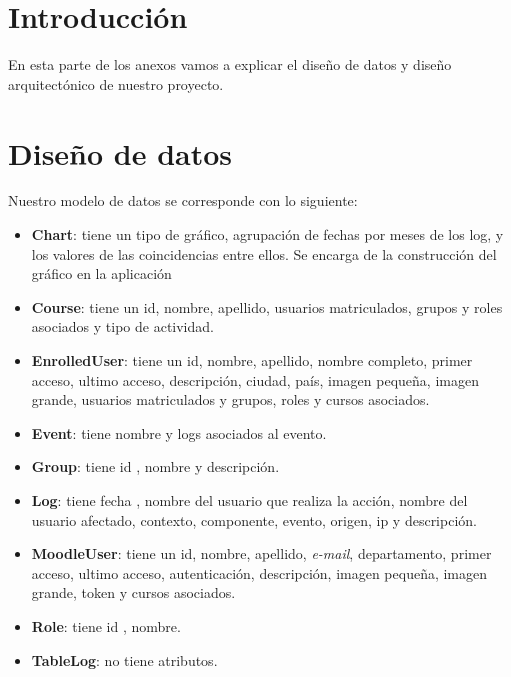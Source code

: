 
\section{Introducción}

En esta parte de los anexos vamos a explicar el diseño de datos y diseño arquitectónico de nuestro proyecto.

\section{Diseño de datos}

Nuestro modelo de datos se corresponde con lo siguiente:

\begin{itemize}
	\tightlist
	\item
	\textbf{Chart}: tiene un tipo de gráfico, agrupación de fechas por meses de los log, y los valores de las coincidencias entre ellos. Se encarga de la construcción del gráfico en la aplicación
	\item
	\textbf{Course}: tiene un id, nombre, apellido, usuarios matriculados, grupos y roles asociados y tipo de actividad.
	\item
	\textbf{EnrolledUser}: tiene un id, nombre, apellido, nombre completo, primer acceso, ultimo acceso, descripción, ciudad, país, imagen pequeña, imagen grande, usuarios matriculados y grupos, roles y cursos asociados.
	\item
	\textbf{Event}: tiene nombre y logs asociados al evento.
	\item
	\textbf{Group}: tiene id , nombre y descripción.
	\item
	\textbf{Log}: tiene fecha , nombre del usuario que realiza la acción, nombre del usuario afectado, contexto, componente, evento, origen, ip y descripción.
	\item
	\textbf{MoodleUser}: tiene un id, nombre, apellido, \emph{e-mail}, departamento, primer acceso, ultimo acceso, autenticación, descripción, imagen pequeña, imagen grande, token y cursos asociados.
	\item
	\textbf{Role}: tiene id , nombre.
	\item
	\textbf{TableLog}: no tiene atributos.
\end{itemize}


